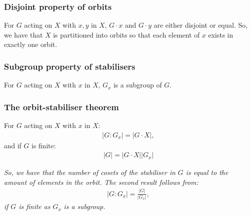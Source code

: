 \documentclass[a4paper, 12pt, twoside]{article}
\begin{document}
\subsubsection{Disjoint property of orbits}

For $G$ acting on $X$ with $x, y$ in $X$, $G \cdot x$ and $G \cdot y$
are either disjoint or equal. So, we have that $X$ is partitioned
into orbits so that each element of $x$ exists in exactly one orbit.

\subsubsection{Subgroup property of stabilisers}

For $G$ acting on $X$ with $x$ in $X$, $G_x$ is a subgroup of $G$.

\subsubsection{The orbit-stabiliser theorem}

For $G$ acting on $X$ with $x$ in $X$:
\begin{gather*}
      |G:G_x| = |G \cdot X|,
\end{gather*}
and if $G$ is finite:
\begin{gather*}
      |G| = |G \cdot X||G_x|
\end{gather*}

\textit{So, we have that the number of cosets of the stabiliser
in $G$ is equal to the amount of elements in the orbit. The 
second result follows from:}
\begin{gather*}
      |G:G_x| = \frac{|G|}{|G_x|},
\end{gather*}
\textit{if $G$ is finite as $G_x$ is a subgroup.}
\end{document}

